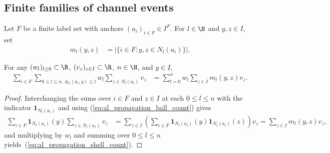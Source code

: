 \subsection{Finite families of channel events}

Let $F$ be a finite label set with anchors $(a_i)_{i\in F}\in I^F$. For
$l\in\N$ and $y,z\in I$, set
\begin{align}
    \label{eq:al_propagation_ball_count}
    m_l(y,z) & =\bigl|\{i\in F:y,z\in N_l(a_i)\}\bigr|.
\end{align}

\begin{lemma}
    \label{thm:al_graph_shell_sum_cardinality}
    \leanok
    For any $(w_l)_{l\ge0}\subset\R$, $(v_z)_{z\in I}\subset\R$, $n\in\N$, and
    $y\in I$,
    \begin{align}
        \label{eq:al_propagation_shell_count}
        \sum_{i\in F}\sum_{0\le l\le n,\ d_G(a_i,y)\le l}
        w_l\sum_{z\in N_l(a_i)}v_z
         & =\sum_{l=0}^{n}w_l\sum_{z\in I}m_l(y,z)v_z.
    \end{align}
\end{lemma}
\begin{proof}
    \leanok
    Interchanging the sums over $i\in F$ and $z\in I$ at each $0\le l\le n$
    with the indicator $\mathbf1_{N_l(a_i)}$ and using
    (\ref{eq:al_propagation_ball_count}) gives
    \begin{align}
        \label{eq:al_propagation_count_reorder}
        \sum_{i\in F}\mathbf1_{N_l(a_i)}(y)
        \sum_{z\in N_l(a_i)}v_z
         & =\sum_{z\in I}\left(\sum_{i\in F}
        \mathbf1_{N_l(a_i)}(y)\mathbf1_{N_l(a_i)}(z)\right)v_z
        =\sum_{z\in I}m_l(y,z)v_z,
    \end{align}
    and multiplying by $w_l$ and summing over $0\le l\le n$
    yields~(\ref{eq:al_propagation_shell_count}).
\end{proof}

